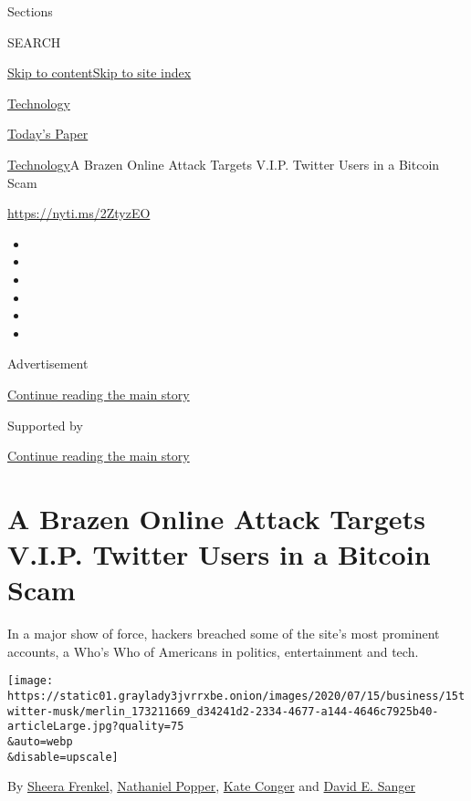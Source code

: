 Sections

SEARCH

\protect\hyperlink{site-content}{Skip to
content}\protect\hyperlink{site-index}{Skip to site index}

\href{https://www.nytimes3xbfgragh.onion/section/technology}{Technology}

\href{https://myaccount.nytimes3xbfgragh.onion/auth/login?response_type=cookie\&client_id=vi}{}

\href{https://www.nytimes3xbfgragh.onion/section/todayspaper}{Today's
Paper}

\href{/section/technology}{Technology}\textbar{}A Brazen Online Attack
Targets V.I.P. Twitter Users in a Bitcoin Scam

\url{https://nyti.ms/2ZtyzEO}

\begin{itemize}
\item
\item
\item
\item
\item
\item
\end{itemize}

Advertisement

\protect\hyperlink{after-top}{Continue reading the main story}

Supported by

\protect\hyperlink{after-sponsor}{Continue reading the main story}

\hypertarget{a-brazen-online-attack-targets-vip-twitter-users-in-a-bitcoin-scam}{%
\section{A Brazen Online Attack Targets V.I.P. Twitter Users in a
Bitcoin
Scam}\label{a-brazen-online-attack-targets-vip-twitter-users-in-a-bitcoin-scam}}

In a major show of force, hackers breached some of the site's most
prominent accounts, a Who's Who of Americans in politics, entertainment
and tech.

\texttt{[image: https://static01.graylady3jvrrxbe.onion/images/2020/07/15/business/15twitter-musk/merlin\_173211669\_d34241d2-2334-4677-a144-4646c7925b40-articleLarge.jpg?quality=75\\\&auto=webp\\\&disable=upscale]}

By \href{https://www.nytimes3xbfgragh.onion/by/sheera-frenkel}{Sheera
Frenkel},
\href{https://www.nytimes3xbfgragh.onion/by/nathaniel-popper}{Nathaniel
Popper}, \href{https://www.nytimes3xbfgragh.onion/by/kate-conger}{Kate
Conger} and
\href{https://www.nytimes3xbfgragh.onion/by/david-e-sanger}{David E.
Sanger}


